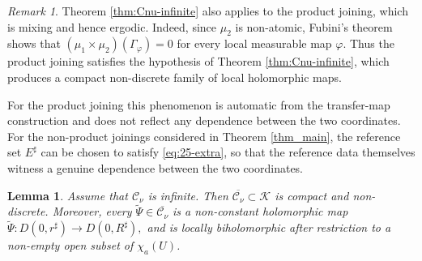 \documentclass[11pt]{amsart}
\numberwithin{equation}{section}
\theoremstyle{plain}
\newtheorem{lem}[thm]{Lemma}
\theoremstyle{definition}
\theoremstyle{remark}
\newtheorem{rmk}[thm]{Remark}
\begin{document}
\begin{rmk}\label{rmk:product-A2}
Theorem \ref{thm:Cnu-infinite} also applies to the product joining,
which is mixing and hence ergodic. Indeed, since $\mu_2$ is
non-atomic, Fubini's theorem shows that
$(\mu_1\times\mu_2)(\Gamma_\varphi)=0$ for every local measurable
map $\varphi$. Thus the product joining satisfies the hypothesis of
Theorem \ref{thm:Cnu-infinite}, which produces a compact
non-discrete family of local holomorphic maps.

For the product joining this phenomenon is automatic from the
transfer-map construction and does not reflect any dependence between
the two coordinates. For the non-product joinings considered in
Theorem \ref{thm_main}, the reference set $E^\sharp$ can be chosen
to satisfy \eqref{eq:25-extra}, so that the reference data themselves
witness a genuine dependence between the two coordinates.
\end{rmk}

\begin{lem}\label{lem:Cnu-closure-nonconstant}
Assume that $\mathcal C_\nu$ is infinite. Then
$\overline{\mathcal C_\nu}\subset\mathcal K$
is compact and non-discrete. Moreover, every
$\widetilde\Psi\in\overline{\mathcal C_\nu}$ is a non-constant
holomorphic map
$
\widetilde\Psi\colon
D(0,r^\sharp)\to D(0,R^\sharp),
$
and is locally biholomorphic after restriction to a non-empty open
subset of $\chi_a(U)$.
\end{lem}
\end{document}
